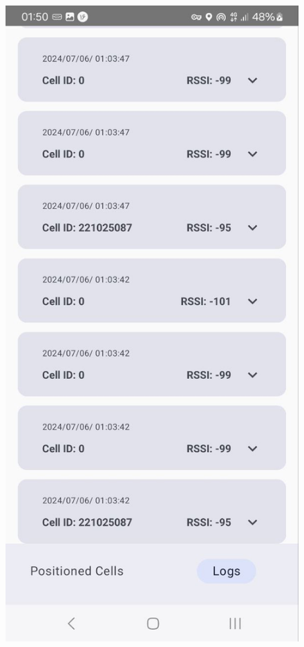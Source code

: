 \documentclass[11pt]{article}
\begin{document}
\begin{figure}[htbp]
    \centering
    \begin{minipage}[b]{0.45\textwidth}
        \centering
        \includegraphics[width=\textwidth]{Output1.jpg}

\end{minipage}
\end{figure}
\end{document}

